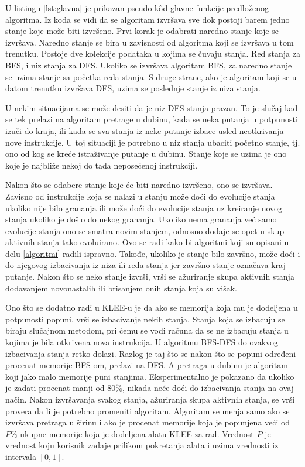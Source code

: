 \documentclass[12pt,oneside]{memoir}
\begin{document}
U listingu \ref{lst:glavna} je prikazan pseudo k\^od glavne funkcije predloženog algoritma. Iz koda se vidi da se algoritam izvršava sve dok postoji barem jedno stanje koje može biti izvršeno. Prvi korak je odabrati naredno stanje koje se izvršava. Naredno stanje se bira u zavisnosti od algoritma koji se izvršava u tom trenutku. Postoje dve kolekcije podataka u kojima se čuvaju stanja. Red stanja za BFS, i niz stanja za DFS. Ukoliko se izvršava algoritam BFS, za naredno stanje se uzima stanje sa početka reda stanja. S druge strane, ako je algoritam koji se u datom trenutku izvršava DFS, uzima se poslednje stanje iz niza stanja. 

U nekim situacijama se može desiti da je niz DFS stanja prazan. To je slučaj kad se tek prelazi na algoritam pretrage u dubinu, kada se neka putanja u potpunosti izuči do kraja, ili kada se sva stanja iz neke putanje izbace usled neotkrivanja nove instrukcije. U toj situaciji je potrebno u niz stanja ubaciti početno stanje, tj. ono od kog se kreće istraživanje putanje u dubinu. Stanje koje se uzima je ono koje je najbliže nekoj do tada neposećenoj instrukciji.

Nakon što se odabere stanje koje će biti naredno izvršeno, ono se izvršava. Zavisno od instrukcije koja se nalazi u stanju može doći do evolucije stanja ukoliko nije bilo grananja ili može doći do evolucije stanja uz kreiranje novog stanja ukoliko je došlo do nekog grananja. Ukoliko nema grananja već samo evolucije stanja ono se smatra novim stanjem, odnosno dodaje se opet u skup aktivnih stanja tako evoluirano. Ovo se radi kako bi algoritmi koji su opisani u delu \ref{algoritmi} radili ispravno. Takođe, ukoliko je stanje bilo završno, može doći i do njegovog izbacivanja iz niza ili reda stanja jer završno stanje označava kraj putanje. Nakon što se neko stanje izvrši, vrši se ažuriranje skupa aktivnih stanja dodavanjem novonastalih ili brisanjem onih stanja koja su višak.

Ono što se dodatno radi u KLEE-u je da ako se memorija koja mu je dodeljena u potpunosti popuni, vrši se izbacivanje nekih stanja. Stanja koja se izbacuju se biraju slučajnom metodom, pri čemu se vodi računa da se ne izbacuju stanja u kojima je bila otkrivena nova instrukcija. U algoritmu BFS-DFS do ovakvog izbacivanja stanja retko dolazi. Razlog je taj što se nakon  što se popuni određeni procenat memorije BFS-om, prelazi na DFS. A pretraga u dubinu je algoritam koji jako malo memorije puni stanjima. Eksperimentalno je pokazano da ukoliko je zadati procenat manji od 80\%, nikada neće doći do izbacivanja stanja na ovaj način. Nakon izvršavanja svakog stanja, ažuriranja skupa aktivnih stanja, se vrši provera da li je potrebno promeniti algoritam. Algoritam se menja samo ako se izvršava pretraga u širinu i ako je procenat memorije koja je popunjena veći od $P\%$ ukupne memorije koja je dodeljena alatu KLEE za rad. Vrednost $P$ je vrednost koju korisnik zadaje prilikom pokretanja alata i uzima vrednosti iz intervala $[0, 1]$.
\end{document}
